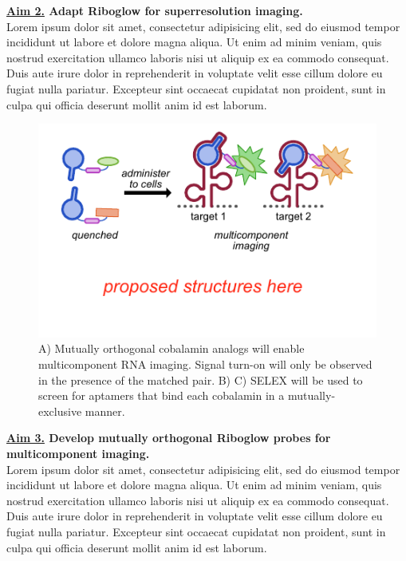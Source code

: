 \textbf{\underline{Aim 2.} Adapt Riboglow for superresolution imaging.}\\
Lorem ipsum dolor sit amet, consectetur adipisicing elit, sed do eiusmod tempor incididunt ut labore et dolore magna aliqua. Ut enim ad minim veniam, quis nostrud exercitation ullamco laboris nisi ut aliquip ex ea commodo consequat. Duis aute irure dolor in reprehenderit in voluptate velit esse cillum dolore eu fugiat nulla pariatur. Excepteur sint occaecat cupidatat non proident, sunt in culpa qui officia deserunt mollit anim id est laborum.

\begin{figure}
\begin{centering}
\includegraphics[width=\textwidth]{figures/fig3.pdf}

\end{centering}
\footnotesize
\caption{\label{figure:multicomponent}
A) Mutually orthogonal cobalamin analogs will enable multicomponent RNA imaging. Signal turn-on will only be observed in the presence of the matched pair. B) C) SELEX will be used to screen for aptamers that bind each cobalamin in a mutually-exclusive manner.
}
\end{figure}

\textbf{\underline{Aim 3.} Develop mutually orthogonal Riboglow probes for multicomponent imaging.}\\
Lorem ipsum dolor sit amet, consectetur adipisicing elit, sed do eiusmod tempor incididunt ut labore et dolore magna aliqua. Ut enim ad minim veniam, quis nostrud exercitation ullamco laboris nisi ut aliquip ex ea commodo consequat. Duis aute irure dolor in reprehenderit in voluptate velit esse cillum dolore eu fugiat nulla pariatur. Excepteur sint occaecat cupidatat non proident, sunt in culpa qui officia deserunt mollit anim id est laborum.

